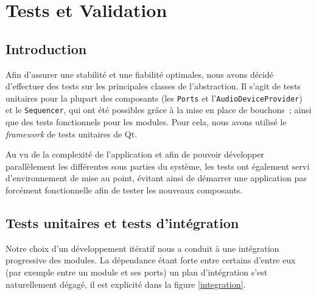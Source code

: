 \section{Tests et Validation}

\subsection{Introduction}

Afin
d'assurer une stabilité et une fiabilité optimales, nous avons décidé d'effectuer des tests sur les principales classes de l'abstraction. Il s'agit de tests unitaires pour la plupart des composants (les \verb!Ports! et l'\verb!AudioDeviceProvider!) et le \verb!Sequencer!, qui ont été possibles grâce à la mise en place de bouchons~;
ainsi que des tests fonctionnels pour les modules.
Pour cela, nous avons utilisé le \emph{framework} de tests
unitaires de Qt.

Au vu de la complexité de l'application et afin de pouvoir développer parallèlement les différentes sous parties du système, les tests ont également servi d'environnement de mise au point, évitant ainsi de démarrer une application pas forcément fonctionnelle afin de tester les nouveaux composants.

\subsection{Tests unitaires et tests d'intégration}

Notre choix d'un développement itératif nous a conduit à une intégration progressive des modules. La dépendance étant forte entre certains d'entre eux (par exemple entre un module et ses ports) un plan d'intégration s'est naturellement dégagé, il est explicité dans la figure \ref{integration}.

